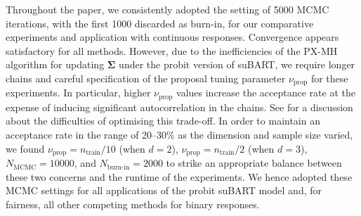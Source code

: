 \documentclass[aoas,preprint]{imsart}
\theoremstyle{plain}
\theoremstyle{definition}
\theoremstyle{remark}
\begin{document}
\begin{appendix}
Throughout the paper, we consistently adopted the setting of 5000 MCMC iterations, with the first 1000 discarded as burn-in, for our comparative experiments and application with continuous responses. Convergence appears satisfactory for all methods. However, 
due to the inefficiencies of the PX-MH algorithm for updating $\boldsymbol{\Sigma}$ under the probit version of suBART, we require longer chains and careful specification of the proposal tuning parameter $\nu_{\operatorname{prop}}$ for these experiments. In particular, higher $\nu_{\operatorname{prop}}$ values increase the acceptance rate at the expense of inducing significant autocorrelation in the chains. See \citet{zhang2006sampling} for a discussion about the difficulties of optimising this trade-off. In order to maintain an acceptance rate in the range of 20--30\% as the dimension and sample size varied, we found $\nu_{\operatorname{prop}}=n_{\operatorname{train}}/10$ (when $d=2$), $\nu_{\operatorname{prop}}=n_{\operatorname{train}}/2$ (when $d=3$), $N_{\operatorname{MCMC}}=10000$, and $N_{\operatorname{burn-in}}=2000$ to strike an appropriate balance between these two concerns and the runtime of the experiments. We hence adopted these MCMC settings for all applications of the probit suBART model and, for fairness, all other competing methods for binary responses. 


\end{appendix}
\end{document}
